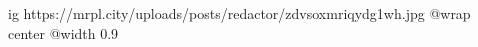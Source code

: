  
 
 
 
 

\ifcmt
  ig https://mrpl.city/uploads/posts/redactor/zdvsoxmriqydg1wh.jpg
  @wrap center
  @width 0.9
\fi
